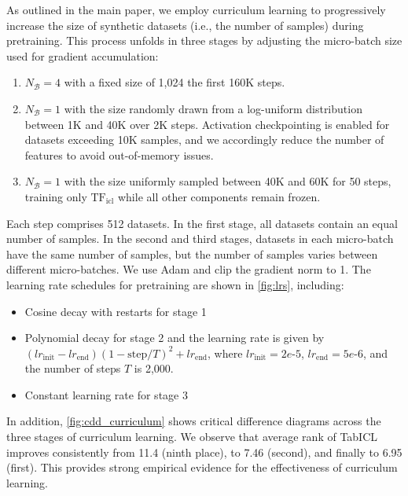 \documentclass{article}
\theoremstyle{plain}
\theoremstyle{definition}
\theoremstyle{remark}
\newcommand{\TFicl}{\text{TF}_{\text{icl}}}
\begin{document}
As outlined in the main paper, we employ curriculum learning to progressively increase the size of synthetic datasets (i.e., the number of samples) during pretraining. This process unfolds in three stages by adjusting the micro-batch size used for gradient accumulation:
\begin{enumerate}[itemsep=2pt, parsep=0pt]
    \item \( N_{\mathcal{B}} = 4 \) with a fixed size of 1,024 the first 160K steps.
    \item \( N_{\mathcal{B}} = 1 \) with the size randomly drawn from a log-uniform distribution between 1K and 40K over 2K steps. Activation checkpointing is enabled for datasets exceeding 10K samples, and we accordingly reduce the number of features to avoid out-of-memory issues.
    \item \( N_{\mathcal{B}} = 1 \) with the size uniformly sampled between 40K and 60K for 50 steps, training only \( \TFicl \) while all other components remain frozen.
\end{enumerate}

Each step comprises 512 datasets. In the first stage, all datasets contain an equal number of samples. In the second and third stages, datasets in each micro-batch have the same number of samples, but the number of samples varies between different micro-batches. We use Adam \cite{kingmaAdamMethodStochastic2014} and clip the gradient norm to 1. The learning rate schedules for pretraining are shown in \cref{fig:lrs}, including:
\begin{itemize}
    \item Cosine decay with restarts for stage 1
    \item Polynomial decay for stage 2 and the learning rate is given by $(lr_{\text{init}} - lr_{\text{end}}) \left(1 - \text{step} / T \right)^2 + lr_{\text{end}}$, where $lr_{\text{init}}=2e\text{-}5$, $lr_{\text{end}}=5e\text{-}6$, and the number of steps $T$ is 2,000.
    \item Constant learning rate for stage 3
\end{itemize}

In addition, \cref{fig:cdd_curriculum} shows critical difference diagrams across the three stages of curriculum learning. We observe that average rank of TabICL improves consistently from 11.4 (ninth place), to 7.46 (second), and finally to 6.95 (first). This provides strong empirical evidence for the effectiveness of curriculum learning.
\end{document}
